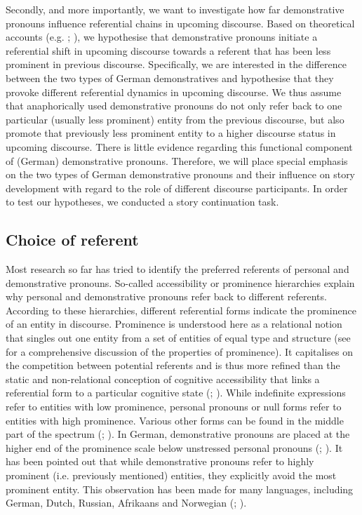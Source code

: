 \documentclass[output=paper,colorlinks,citecolor=brown]{langscibook}
\begin{document}
Secondly, and more importantly, we want to investigate how far demonstrative pronouns influence referential chains in upcoming discourse. Based on theoretical accounts (e.g. \citealt{Weinrich1993}; \citealt{Abraham2002}), we hypothesise that demonstrative pronouns initiate a referential shift in upcoming discourse towards a referent that has been less prominent in previous discourse. Specifically, we are interested in the difference between the two types of German demonstratives and hypothesise that they provoke different referential dynamics in upcoming discourse. We thus assume that anaphorically used demonstrative pronouns do not only refer back to one particular (usually less prominent) entity from the previous discourse, but also promote that previously less prominent entity to a higher discourse status in upcoming discourse. There is little evidence regarding this functional component of (German) demonstrative pronouns. Therefore, we will place special emphasis on the two types of German demonstrative pronouns and their influence on story development with regard to the role of different discourse participants. In order to test our hypotheses, we conducted a story continuation task. 

\subsection{Choice of referent}\label{sec:fuchs:1.2}

Most research so far has tried to identify the preferred referents of personal and demonstrative pronouns. So-called accessibility or prominence hierarchies explain why personal and demonstrative pronouns refer back to different referents. According to these hierarchies, different referential forms indicate the prominence of an entity in discourse. Prominence is understood here as a relational notion that singles out one entity from a set of entities of equal type and structure (see \citealt{VonHeusingerSchumacher2019} for a comprehensive discussion of the properties of prominence). It capitalises on the competition between potential referents and is thus more refined than the static and non-relational conception of cognitive accessibility that links a referential form to a particular cognitive state (\citealt{Ariel1990}; \citealt{GundelEtAl1993}). While indefinite expressions refer to entities with low prominence, personal pronouns or null forms refer to entities with high prominence. Various other forms can be found in the middle part of the spectrum (\citealt{Ariel1990,Ariel2004}; \citealt{GundelEtAl1993}). In German, demonstrative pronouns are placed at the higher end of the prominence scale below unstressed personal pronouns (\citealt{Ahrenholz2007}; \citealt{Ellert2011}). It has been pointed out that while demonstrative pronouns refer to highly prominent (i.e. previously mentioned) entities, they explicitly avoid the most prominent entity. This observation has been made for many languages, including German, Dutch, Russian, Afrikaans and Norwegian (\citealt{Johannessen1996}; \citealt{Comrie1997}). 
\end{document}
